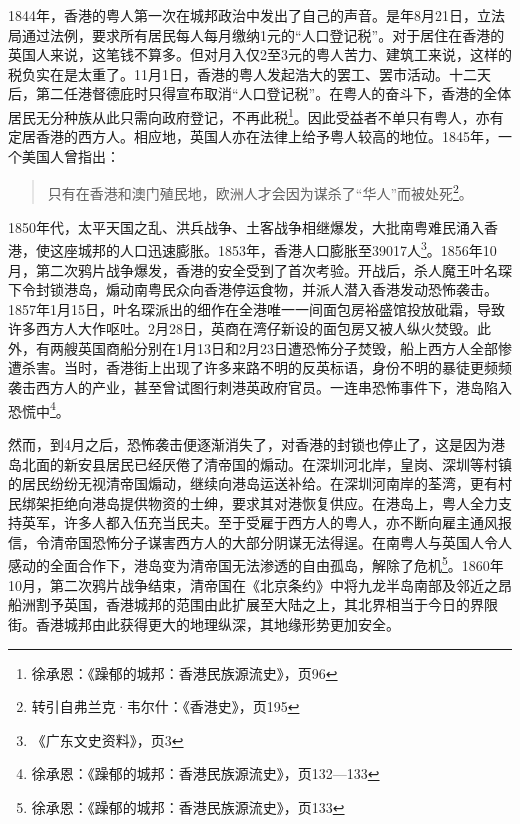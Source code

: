 1844年，香港的粤人第一次在城邦政治中发出了自己的声音。是年8月21日，立法局通过法例，要求所有居民每人每月缴纳1元的“人口登记税”。对于居住在香港的英国人来说，这笔钱不算多。但对月入仅2至3元的粤人苦力、建筑工来说，这样的税负实在是太重了。11月1日，香港的粤人发起浩大的罢工、罢市活动。十二天后，第二任港督德庇时只得宣布取消“人口登记税”。在粤人的奋斗下，香港的全体居民无分种族从此只需向政府登记，不再此税\footnote{徐承恩：《躁郁的城邦：香港民族源流史》，页96}。因此受益者不单只有粤人，亦有定居香港的西方人。相应地，英国人亦在法律上给予粤人较高的地位。1845年，一个美国人曾指出：

\begin{quote}

只有在香港和澳门殖民地，欧洲人才会因为谋杀了“华人”而被处死\footnote{转引自弗兰克·韦尔什：《香港史》，页195}。
\end{quote}

1850年代，太平天国之乱、洪兵战争、土客战争相继爆发，大批南粤难民涌入香港，使这座城邦的人口迅速膨胀。1853年，香港人口膨胀至39017人\footnote{《广东文史资料》，页3}。1856年10月，第二次鸦片战争爆发，香港的安全受到了首次考验。开战后，杀人魔王叶名琛下令封锁港岛，煽动南粤民众向香港停运食物，并派人潜入香港发动恐怖袭击。1857年1月15日，叶名琛派出的细作在全港唯一一间面包房裕盛馆投放砒霜，导致许多西方人大作呕吐。2月28日，英商在湾仔新设的面包房又被人纵火焚毁。此外，有两艘英国商船分别在1月13日和2月23日遭恐怖分子焚毁，船上西方人全部惨遭杀害。当时，香港街上出现了许多来路不明的反英标语，身份不明的暴徒更频频袭击西方人的产业，甚至曾试图行刺港英政府官员。一连串恐怖事件下，港岛陷入恐慌中\footnote{徐承恩：《躁郁的城邦：香港民族源流史》，页132—133}。

然而，到4月之后，恐怖袭击便逐渐消失了，对香港的封锁也停止了，这是因为港岛北面的新安县居民已经厌倦了清帝国的煽动。在深圳河北岸，皇岗、深圳等村镇的居民纷纷无视清帝国煽动，继续向港岛运送补给。在深圳河南岸的荃湾，更有村民绑架拒绝向港岛提供物资的士绅，要求其对港恢复供应。在港岛上，粤人全力支持英军，许多人都入伍充当民夫。至于受雇于西方人的粤人，亦不断向雇主通风报信，令清帝国恐怖分子谋害西方人的大部分阴谋无法得逞。在南粤人与英国人令人感动的全面合作下，港岛变为清帝国无法渗透的自由孤岛，解除了危机\footnote{徐承恩：《躁郁的城邦：香港民族源流史》，页133}。1860年10月，第二次鸦片战争结束，清帝国在《北京条约》中将九龙半岛南部及邻近之昂船洲割予英国，香港城邦的范围由此扩展至大陆之上，其北界相当于今日的界限街。香港城邦由此获得更大的地理纵深，其地缘形势更加安全。

